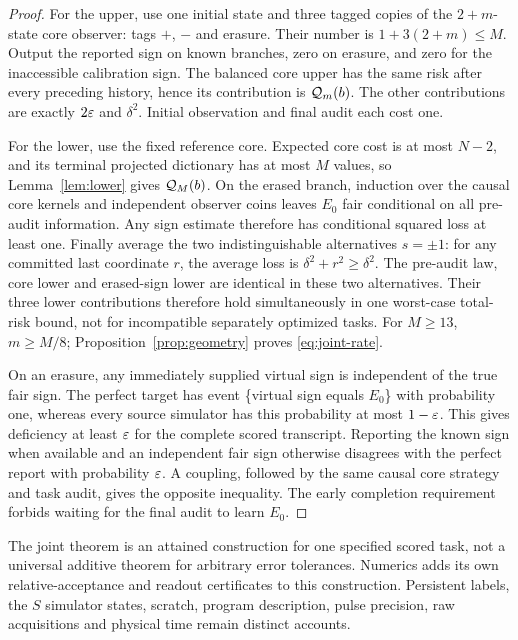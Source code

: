 \begin{proof}
For the upper, use one initial state and three tagged copies of the $2+m$-state core observer: tags $+$, $-$ and erasure. Their number is $1+3(2+m)\le M$. Output the reported sign on known branches, zero on erasure, and zero for the inaccessible calibration sign. The balanced core upper has the same risk after every preceding history, hence its contribution is $\mathcal Q_m(b)$. The other contributions are exactly $2\varepsilon$ and $\delta^2$. Initial observation and final audit each cost one.

For the lower, use the fixed reference core. Expected core cost is at most $N-2$, and its terminal projected dictionary has at most $M$ values, so Lemma~\ref{lem:lower} gives $\mathcal Q_M(b)$. On the erased branch, induction over the causal core kernels and independent observer coins leaves $E_0$ fair conditional on all pre-audit information. Any sign estimate therefore has conditional squared loss at least one. Finally average the two indistinguishable alternatives $s=\pm1$: for any committed last coordinate $r$, the average loss is $\delta^2+r^2\ge\delta^2$. The pre-audit law, core lower and erased-sign lower are identical in these two alternatives. Their three lower contributions therefore hold simultaneously in one worst-case total-risk bound, not for incompatible separately optimized tasks. For $M\ge13$, $m\ge M/8$; Proposition~\ref{prop:geometry} proves \eqref{eq:joint-rate}.

On an erasure, any immediately supplied virtual sign is independent of the true fair sign. The perfect target has event \{virtual sign equals $E_0$\} with probability one, whereas every source simulator has this probability at most $1-\varepsilon$. This gives deficiency at least $\varepsilon$ for the complete scored transcript. Reporting the known sign when available and an independent fair sign otherwise disagrees with the perfect report with probability $\varepsilon$. A coupling, followed by the same causal core strategy and task audit, gives the opposite inequality. The early completion requirement forbids waiting for the final audit to learn $E_0$.
\end{proof}

The joint theorem is an attained construction for one specified scored task, not a universal additive theorem for arbitrary error tolerances. Numerics adds its own relative-acceptance and readout certificates to this construction. Persistent labels, the $S$ simulator states, scratch, program description, pulse precision, raw acquisitions and physical time remain distinct accounts.
